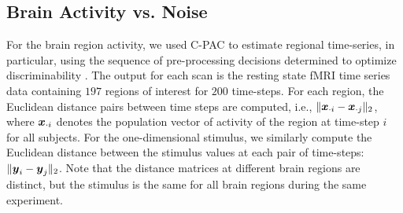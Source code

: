 \documentclass[11pt]{article}
\begin{document}
\subsection{Brain Activity vs. Noise}

For the brain region activity, we used C-PAC to estimate regional time-series, in particular, using the sequence of pre-processing decisions determined to optimize discriminability \cite{Wang2016}.  The output for each scan is the resting state fMRI time series data containing $197$ regions of interest for $200$ time-steps.
For each region, the Euclidean distance pairs between time steps are computed, i.e., $\|\boldsymbol{x}_{\cdot i}-\boldsymbol{x}_{\cdot j}\|_2$,  where $\boldsymbol{x}_{\cdot i}$ denotes the population vector of activity of the region at time-step $i$ for all subjects.
For the one-dimensional stimulus, we similarly compute the Euclidean distance between the stimulus values at each pair of time-steps: $\|\boldsymbol{y}_i - \boldsymbol{y}_j\|_2$.
Note that the distance matrices at different brain regions are distinct, but the stimulus is the same for all brain regions during the same experiment.
\end{document}
